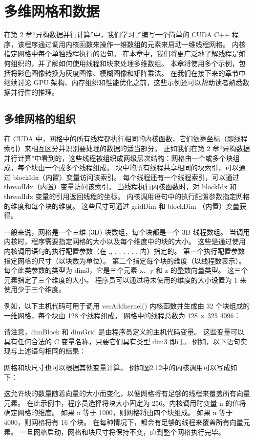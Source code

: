 \section{多维网格和数据}
在第 2 章“异构数据并行计算”中，我们学习了编写一个简单的 CUDA C++ 程序，该程序通过调用内核函数来操作一维数组的元素来启动一维线程网格。 内核指定网格中每个单独线程执行的语句。 在本章中，我们将更广泛地了解线程是如何组织的，并了解如何使用线程和块来处理多维数组。 本章将使用多个示例，包括将彩色图像转换为灰度图像、模糊图像和矩阵乘法。 在我们在接下来的章节中继续讨论 GPU 架构、内存组织和性能优化之前，这些示例还可以帮助读者熟悉数据并行性的推理。

\subsection{多维网格的组织}
在 CUDA 中，网格中的所有线程都执行相同的内核函数，它们依靠坐标（即线程索引）来相互区分并识别要处理的数据的适当部分。 正如我们在第 2 章“异构数据并行计算”中看到的，这些线程被组织成两级层次结构：网格由一个或多个块组成，每个块由一个或多个线程组成。 块中的所有线程共享相同的块索引，可以通过 blockIdx（内置）变量访问该索引。 每个线程还有一个线程索引，可以通过 threadIdx（内置）变量访问该索引。 当线程执行内核函数时，对 blockIdx 和 threadIdx 变量的引用返回线程的坐标。 内核调用语句中的执行配置参数指定网格的维度和每个块的维度。 这些尺寸可通过 gridDim 和 blockDim （内置）变量获得。

一般来说，网格是一个三维 (3D) 块数组，每个块都是一个 3D 线程数组。 当调用内核时，程序需要指定网格的大小以及每个维度中的块的大小。 这些是通过使用内核调用语句的执行配置参数（在 ,, , . . . . . 内）指定的。 第一个执行配置参数指定网格的尺寸（以块数为单位）。 第二个指定每个块的维度（以线程数表示）。 每个此类参数的类型为 dim3，它是三个元素 x、y 和 z 的整数向量类型。 这三个元素指定了三个维度的大小。 程序员可以通过将未使用的维度的大小设置为 1 来使用少于三个维度。

例如，以下主机代码可用于调用 vecAddkernel() 内核函数并生成由 32 个块组成的一维网格，每个块由 128 个线程组成。 网格中的线程总数为 128 × 325 4096：

请注意，dimBlock 和 dimGrid 是由程序员定义的主机代码变量。 这些变量可以具有任何合法的 C 变量名称，只要它们具有类型 dim3 即可。 例如，以下语句实现与上述语句相同的结果：

网格和块尺寸也可以根据其他变量计算。 例如图2.12中的内核调用可以写成如下：

这允许块的数量随着向量的大小而变化，以便网格将有足够的线程来覆盖所有向量元素。 在此示例中，程序员选择将块大小固定为 256。内核调用时变量 n 的值将确定网格的维度。 如果 n 等于 1000，则网格将由四个块组成。 如果 n 等于 4000，则网格将有 16 个块。 在每种情况下，都会有足够的线程来覆盖所有向量元素。 一旦网格启动，网格和块尺寸将保持不变，直到整个网格执行完毕。

